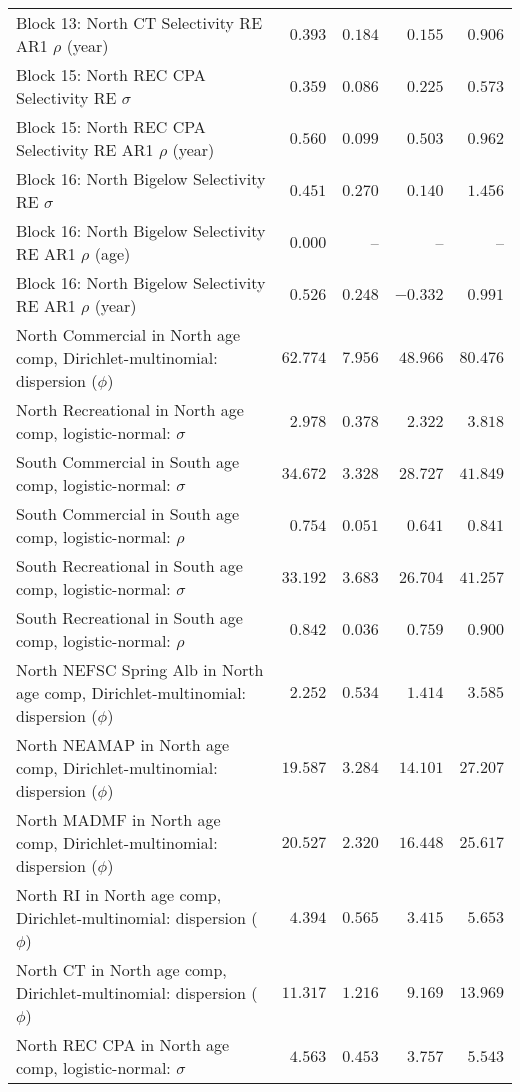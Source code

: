\documentclass[
]{article}
\begin{document}
\begin{landscape}
\begin{longtable}[t]{lrrrr}
Block 13: North CT Selectivity RE AR1 $\rho$ (year) & $0.393$ & $0.184$ & $0.155$ & $0.906$\\
\addlinespace
Block 15: North REC CPA Selectivity RE $\sigma$ & $0.359$ & $0.086$ & $0.225$ & $0.573$\\
Block 15: North REC CPA Selectivity RE AR1 $\rho$ (year) & $0.560$ & $0.099$ & $0.503$ & $0.962$\\
Block 16: North Bigelow Selectivity RE $\sigma$ & $0.451$ & $0.270$ & $0.140$ & $1.456$\\
Block 16: North Bigelow Selectivity RE AR1 $\rho$ (age) & $0.000$ & -- & -- & --\\
Block 16: North Bigelow Selectivity RE AR1 $\rho$ (year) & $0.526$ & $0.248$ & $-0.332$ & $0.991$\\
\addlinespace
North Commercial in North age comp, Dirichlet-multinomial: dispersion ($\phi$) & $62.774$ & $7.956$ & $48.966$ & $80.476$\\
North Recreational in North age comp, logistic-normal: $\sigma$ & $2.978$ & $0.378$ & $2.322$ & $3.818$\\
South Commercial in South age comp, logistic-normal: $\sigma$ & $34.672$ & $3.328$ & $28.727$ & $41.849$\\
South Commercial in South age comp, logistic-normal: $\rho$ & $0.754$ & $0.051$ & $0.641$ & $0.841$\\
South Recreational in South age comp, logistic-normal: $\sigma$ & $33.192$ & $3.683$ & $26.704$ & $41.257$\\
\addlinespace
South Recreational in South age comp, logistic-normal: $\rho$ & $0.842$ & $0.036$ & $0.759$ & $0.900$\\
North NEFSC Spring Alb in North age comp, Dirichlet-multinomial: dispersion ($\phi$) & $2.252$ & $0.534$ & $1.414$ & $3.585$\\
North NEAMAP in North age comp, Dirichlet-multinomial: dispersion ($\phi$) & $19.587$ & $3.284$ & $14.101$ & $27.207$\\
North MADMF in North age comp, Dirichlet-multinomial: dispersion ($\phi$) & $20.527$ & $2.320$ & $16.448$ & $25.617$\\
North RI in North age comp, Dirichlet-multinomial: dispersion ($\phi$) & $4.394$ & $0.565$ & $3.415$ & $5.653$\\
\addlinespace
North CT in North age comp, Dirichlet-multinomial: dispersion ($\phi$) & $11.317$ & $1.216$ & $9.169$ & $13.969$\\
North REC CPA in North age comp, logistic-normal: $\sigma$ & $4.563$ & $0.453$ & $3.757$ & $5.543$\\

\end{longtable}
\end{landscape}
\end{document}
